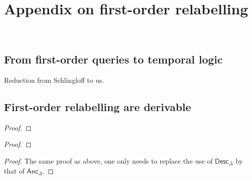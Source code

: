 

\section{Appendix on first-order relabelling}~\label{sec:AppendixForat}

\subsection{From first-order queries to temporal logic}
Reduction from Schlingloff to us.

\subsection{First-order relabelling are derivable}

\begin{lemma}\label{lem:nextmod}
\end{lemma}
\begin{proof}
\end{proof}

\begin{lemma}\label{lem:untilmod}
\end{lemma}
\begin{proof}
\end{proof}


\begin{lemma}\label{lem:sincemod}

\end{lemma}
\begin{proof}
The same proof as above, one only needs to replace the use of $\mathsf{Desc}_\Delta$ by that of $\mathsf{Anc}_\Delta$.
\end{proof}

